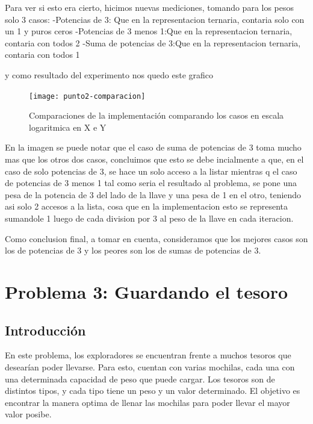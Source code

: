 \documentclass[spanish,12pt]{article}
\begin{document}
Para ver si esto era cierto, hicimos nuevas mediciones, tomando para los pesos  solo 3 casos:
-Potencias de 3: Que en la representacion ternaria, contaria solo con un 1 y puros ceros
-Potencias de 3 menos 1:Que en la representacion ternaria, contaria con todos 2
-Suma de potencias de 3:Que en la representacion ternaria, contaria con todos 1

y como resultado del experimento nos quedo este grafico
\begin{figure}[H]
\centering
\texttt{[image: punto2-comparacion]}
\caption{Comparaciones de la implementaci\'on comparando los casos en escala logaritmica en X e Y }
\end{figure}

En la imagen se puede notar que el caso de suma de potencias de 3 toma mucho mas que los otros dos casos, concluimos que esto se debe incialmente a que, en el caso de solo potencias de 3, se hace un solo acceso a la listar mientras q el caso de potencias de 3 menos 1
tal como seria el resultado al problema, se pone una pesa de la potencia de 3 del lado de la llave y una pesa de 1 en el otro, teniendo asi solo 2 accesos a la lista, cosa que en la implementacion esto se representa sumandole 1 luego de cada division por 3 al peso de la llave en cada iteracion.

Como conclusion final, a tomar en cuenta, consideramos que los mejores casos son los de potencias de 3 y los peores son los de sumas de potencias de 3.






\section{Problema 3: Guardando el tesoro}

\subsection{Introducción}

En este problema, los exploradores se encuentran frente a muchos tesoros que desearían poder llevarse. Para esto, cuentan con varias mochilas, cada una con una determinada capacidad de peso que puede cargar.
Los tesoros son de distintos tipos, y cada tipo tiene un peso y un valor determinado.
El objetivo es encontrar la manera optima de llenar las mochilas para poder llevar el mayor valor posibe.
\end{document}
